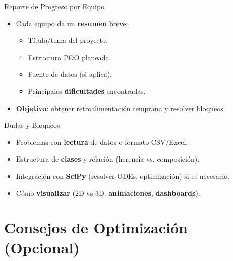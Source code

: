 \documentclass[10pt]{beamer}
\begin{document}
\begin{frame}{Reporte de Progreso por Equipo}
  \begin{itemize}
    \item Cada equipo da un \textbf{resumen} breve:
      \begin{itemize}
        \item Título/tema del proyecto.
        \item Estructura POO planeada.
        \item Fuente de datos (si aplica).
        \item Principales \textbf{dificultades} encontradas.
      \end{itemize}
    \item \textbf{Objetivo}: obtener retroalimentación temprana y resolver bloqueos.
  \end{itemize}
\end{frame}

\begin{frame}{Dudas y Bloqueos}
  \begin{itemize}
    \item Problemas con \textbf{lectura} de datos o formato CSV/Excel.
    \item Estructura de \textbf{clases} y relación (herencia vs. composición).
    \item Integración con \textbf{SciPy} (resolver ODEs, optimización) si es necesario.
    \item Cómo \textbf{visualizar} (2D vs 3D, \textbf{animaciones}, \textbf{dashboards}).
  \end{itemize}
\end{frame}

\section{Consejos de Optimización (Opcional)}
\end{document}
